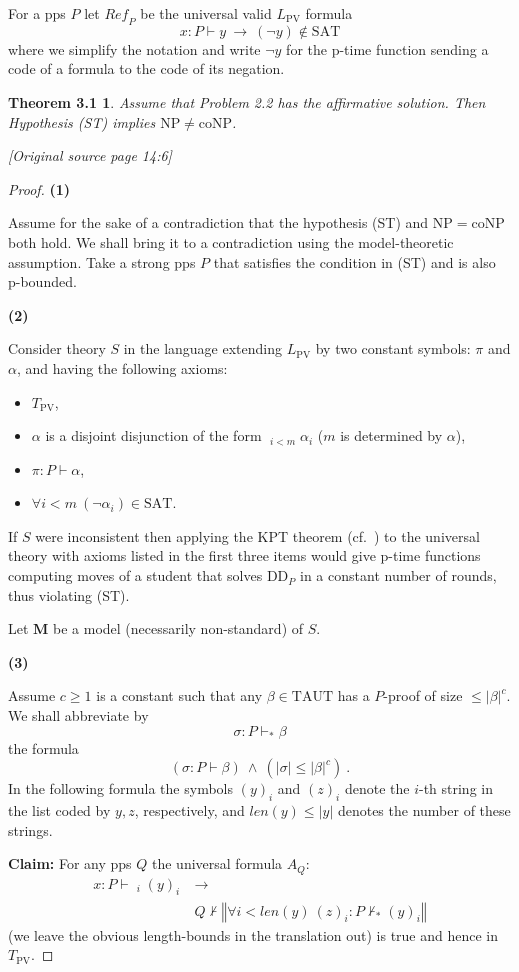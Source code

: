 \documentclass[11pt]{article}
\newcommand{\LPV}{L_{\mathrm{PV}}}
\newcommand{\TPV}{T_{\mathrm{PV}}}
\newcommand{\TAUT}{\mathrm{TAUT}}
\newcommand{\SAT}{\mathrm{SAT}}
\newcommand{\NP}{\mathrm{NP}}
\newcommand{\coNP}{\mathrm{coNP}}
\newcommand{\DDP}{\mathrm{DD}_P}
\newcommand{\len}{\mathit{len}}
\newcommand{\srcRef}{\mathit{Ref}}
\newcommand{\tr}[1]{\left\Vert #1\right\Vert}
\newcommand{\dvee}{\mathop{\dot{\bigvee}}}
\newcommand{\sourcepage}[1]{\par\Needspace{5\baselineskip}\bigskip\noindent\textit{[Original source page 14:#1]}\par\medskip}
\newtheorem*{sourcetheoremthreeone}{Theorem 3.1}
\begin{document}
For a pps $P$ let $\srcRef_P$ be the universal valid $\LPV$ formula
\[
x:P\vdash y\ \to\ (\neg y)\notin\SAT
\]
where we simplify the notation and write $\neg y$ for the p-time function sending a code of a formula to the code of its negation.
\begin{sourcetheoremthreeone}
Assume that Problem 2.2 has the affirmative solution. Then Hypothesis (ST) implies $\NP\ne\coNP$.
\end{sourcetheoremthreeone}

\sourcepage{6}
\begin{proof}
\noindent\textbf{(1)}

Assume for the sake of a contradiction that the hypothesis (ST) and $\NP=\coNP$ both hold. We shall bring it to a contradiction using the model-theoretic assumption. Take a strong pps $P$ that satisfies the condition in (ST) and is also p-bounded.

\noindent\textbf{(2)}

Consider theory $S$ in the language extending $\LPV$ by two constant symbols: $\pi$ and $\alpha$, and having the following axioms:
\begin{itemize}
\item $\TPV$,
\item $\alpha$ is a disjoint disjunction of the form $\dvee_{i<m}\alpha_i$ ($m$ is determined by $\alpha$),
\item $\pi:P\vdash\alpha$,
\item $\forall i<m\ (\neg\alpha_i)\in\SAT$.
\end{itemize}
If $S$ were inconsistent then applying the KPT theorem (cf.\ \cite{KPT91,Kra95,Kra25}) to the universal theory with axioms listed in the first three items would give p-time functions computing moves of a student that solves $\DDP$ in a constant number of rounds, thus violating (ST).

Let $\mathbf{M}$ be a model (necessarily non-standard) of $S$.

\noindent\textbf{(3)}

Assume $c\ge1$ is a constant such that any $\beta\in\TAUT$ has a $P$-proof of size $\le|\beta|^c$. We shall abbreviate by
\[
\sigma:P\vdash_*\beta
\]
the formula
\[
(\sigma:P\vdash\beta)\ \wedge\ (|\sigma|\le|\beta|^c)\ .
\]
In the following formula the symbols $(y)_i$ and $(z)_i$ denote the $i$-th string in the list coded by $y,z$, respectively, and $\len(y)\le|y|$ denotes the number of these strings.

\noindent\textbf{Claim:} For any pps $Q$ the universal formula $A_Q$:
\begin{equation}
\begin{aligned}
x:P\vdash\dvee_i(y)_i\ &\to\\
&Q\not\vdash\tr{\forall i<\len(y)\ (z)_i:P\not\vdash_*(y)_i}
\end{aligned}
\tag{3.1}\label{eq:31}
\end{equation}
(we leave the obvious length-bounds in the translation out) is true and hence in $\TPV$.


\end{proof}
\end{document}

